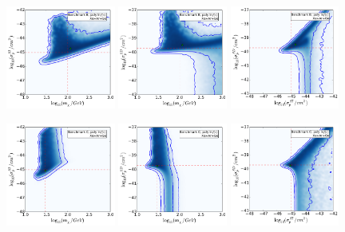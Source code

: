 \begin{figure}[pht!]
  \includegraphics[trim=0.2cm 0.2cm 0.2cm 0.2cm, clip,width=0.32\textwidth]{NT/BenchmarkB_poly_noIC-mx_sigsi.pdf}
  \includegraphics[trim=0.2cm 0.2cm 0.2cm 0.2cm, clip,width=0.32\textwidth]{NT/BenchmarkB_poly_noIC-mx_sigsd.pdf}
  \includegraphics[trim=0.2cm 0.2cm 0.2cm 0.2cm, clip,width=0.32\textwidth]{NT/BenchmarkB_poly_noIC-sigsi_sigsd.pdf}

  \includegraphics[trim=0.2cm 0.2cm 0.2cm 0.2cm, clip,width=0.32\textwidth]{NT/BenchmarkC_poly_noIC-mx_sigsi.pdf}
  \includegraphics[trim=0.2cm 0.2cm 0.2cm 0.2cm, clip,width=0.32\textwidth]{NT/BenchmarkC_poly_noIC-mx_sigsd.pdf}
  \includegraphics[trim=0.2cm 0.2cm 0.2cm 0.2cm, clip,width=0.32\textwidth]{NT/BenchmarkC_poly_noIC-sigsi_sigsd.pdf}


\end{figure}
